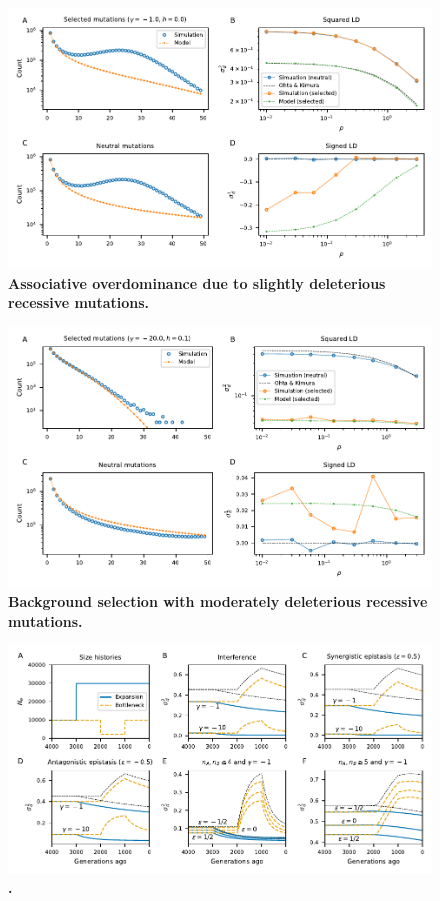 \documentclass[]{article}
\begin{document}
\begin{figure}[ht!]
    \centering
    \includegraphics{../figures/bgs_gamma_-1.0_h_0.0_n_50}
    \caption{
        \textbf{Associative overdominance due to slightly deleterious recessive mutations.}
    }
    \label{fig:bgs3}
\end{figure}

\begin{figure}[ht!]
    \centering
    \includegraphics{../figures/bgs_gamma_-20.0_h_0.1_n_80}
    \caption{
        \textbf{Background selection with moderately deleterious recessive mutations.}
    }
    \label{fig:bgs4}
\end{figure}

\begin{figure}[ht!]
    \centering
    \includegraphics{../figures/demog_bottle_expand.sd2}
    \caption{
        \textbf{.}
    }
    \label{fig:toy_sd2}
\end{figure}
\end{document}
